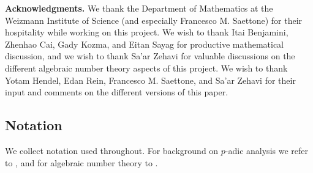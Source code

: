 \documentclass{article}
\theoremstyle{plain}
\theoremstyle{definition}
\theoremstyle{remark}
\begin{document}
\medskip
\noindent\textbf{Acknowledgments.} We thank the Department of Mathematics at the Weizmann Institute of Science (and especially Francesco M. Saettone) for their hospitality while working on this project. We wish to thank Itai Benjamini, Zhenhao Cai, Gady Kozma, and Eitan Sayag for productive mathematical discussion, and we wish to thank Sa'ar Zehavi for valuable discussions on the different algebraic number theory aspects of this project. We wish to thank Yotam Hendel, Edan Rein,  Francesco M. Saettone, and Sa'ar Zehavi for their input and comments on the different versions of this paper. 

\subsection*{Notation}\label{sec:notation}

We collect notation used throughout. For background on $p$-adic analysis we refer to \cite{Gouvea,Serre}, and for algebraic number theory to \cite{Marcus,Neukirch}.
\end{document}

